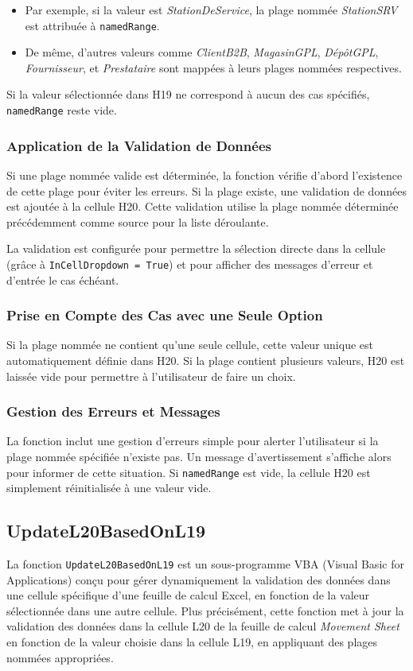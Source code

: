 \documentclass[a4paper, oneside, 12pt, final]{extreport}
\begin{document}
\begin{itemize}
    \item Par exemple, si la valeur est \textit{StationDeService}, la plage nommée \textit{StationSRV} est attribuée à \texttt{namedRange}.
    \item De même, d'autres valeurs comme \textit{ClientB2B}, \textit{MagasinGPL}, \textit{DépôtGPL}, \textit{Fournisseur}, et \textit{Prestataire} sont mappées à leurs plages nommées respectives.
\end{itemize}

Si la valeur sélectionnée dans H19 ne correspond à aucun des cas spécifiés, \texttt{namedRange} reste vide.

\subsubsection{Application de la Validation de Données}
Si une plage nommée valide est déterminée, la fonction vérifie d'abord l'existence de cette plage pour éviter les erreurs. Si la plage existe, une validation de données est ajoutée à la cellule H20. Cette validation utilise la plage nommée déterminée précédemment comme source pour la liste déroulante.

La validation est configurée pour permettre la sélection directe dans la cellule (grâce à \texttt{InCellDropdown = True}) et pour afficher des messages d'erreur et d'entrée le cas échéant.

\subsubsection{Prise en Compte des Cas avec une Seule Option}
Si la plage nommée ne contient qu'une seule cellule, cette valeur unique est automatiquement définie dans H20. Si la plage contient plusieurs valeurs, H20 est laissée vide pour permettre à l'utilisateur de faire un choix.

\subsubsection{Gestion des Erreurs et Messages}
La fonction inclut une gestion d'erreurs simple pour alerter l'utilisateur si la plage nommée spécifiée n'existe pas. Un message d'avertissement s'affiche alors pour informer de cette situation. Si \texttt{namedRange} est vide, la cellule H20 est simplement réinitialisée à une valeur vide.


\subsection{UpdateL20BasedOnL19}
La fonction \texttt{UpdateL20BasedOnL19} est un sous-programme VBA (Visual Basic for Applications) conçu pour gérer dynamiquement la validation des données dans une cellule spécifique d'une feuille de calcul Excel, en fonction de la valeur sélectionnée dans une autre cellule. Plus précisément, cette fonction met à jour la validation des données dans la cellule L20 de la feuille de calcul \textit{Movement Sheet} en fonction de la valeur choisie dans la cellule L19, en appliquant des plages nommées appropriées.
\end{document}
